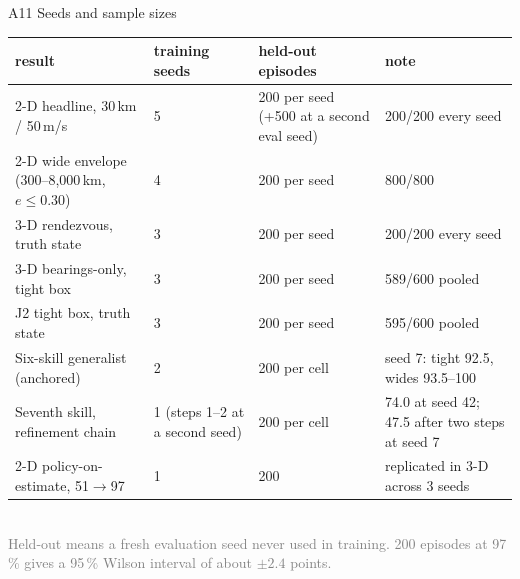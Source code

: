 \documentclass[aspectratio=169,11pt]{beamer}
\begin{document}
\begin{frame}{A11 \; Seeds and sample sizes}
\scriptsize
\begin{tabular}{@{}p{4.6cm}p{2.6cm}p{2.6cm}p{3.4cm}@{}}
\toprule
result & training seeds & held-out episodes & note\\
\midrule
2-D headline, 30\,km / 50\,m/s & 5 & 200 per seed (+500 at a second eval seed) & 200/200 every seed\\
2-D wide envelope (300--8,000\,km, $e\le0.30$) & 4 & 200 per seed & 800/800\\
3-D rendezvous, truth state & 3 & 200 per seed & 200/200 every seed\\
3-D bearings-only, tight box & 3 & 200 per seed & 589/600 pooled\\
J2 tight box, truth state & 3 & 200 per seed & 595/600 pooled\\
Six-skill generalist (anchored) & 2 & 200 per cell & seed 7: tight 92.5, wides 93.5--100\\
Seventh skill, refinement chain & 1 (steps 1--2 at a second seed) & 200 per cell & 74.0 at seed 42; 47.5 after two steps at seed 7\\
2-D policy-on-estimate, 51$\to$97 & 1 & 200 & replicated in 3-D across 3 seeds\\
\bottomrule
\end{tabular}
\\[2mm]\textcolor{grey}{Held-out means a fresh evaluation seed never used in training. 200 episodes at 97\,\% gives a 95\,\% Wilson interval of about $\pm2.4$ points.}
\end{frame}
\end{document}
